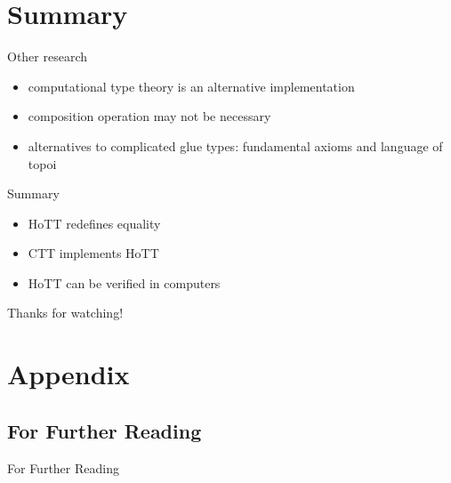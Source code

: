 \documentclass[english,draft]{beamer}
\begin{document}
\section*{Summary}


\begin{frame}{Other research}
    \begin{itemize}
        \item computational type theory is an alternative implementation 
        \item composition operation may not be necessary
        \item alternatives to complicated glue types: fundamental axioms and language of topoi
    \end{itemize}
\end{frame}


\begin{frame}{Summary}

    \begin{itemize}
        \item HoTT redefines equality
        \item CTT implements HoTT
        \item HoTT can be verified in computers 
    \end{itemize}

Thanks for watching!

\end{frame}

\appendix

\section*{Appendix}

\subsection*{For Further Reading}
\begin{frame}[allowframebreaks]{For Further Reading}



\end{frame}
\end{document}
